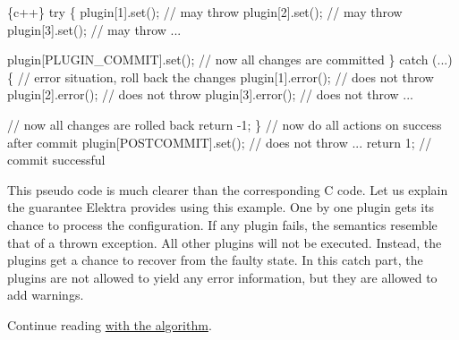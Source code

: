 \begin{DoxyCode}
\{c++\}
try \{
        plugin[1].set(); // may throw
        plugin[2].set(); // may throw
        plugin[3].set(); // may throw
        ...

        plugin[PLUGIN\_COMMIT].set(); // now all changes are committed
\} catch (...) \{
        // error situation, roll back the changes
        plugin[1].error(); // does not throw
        plugin[2].error(); // does not throw
        plugin[3].error(); // does not throw
        ...

        // now all changes are rolled back
        return -1;
\} // now do all actions on success after commit
plugin[POSTCOMMIT].set(); // does not throw
...
return 1; // commit successful
\end{DoxyCode}


This pseudo code is much clearer than the corresponding C code. Let us explain the guarantee Elektra provides using this example. One by one plugin gets its chance to process the configuration. If any plugin fails, the semantics resemble that of a thrown exception. All other plugins will not be executed. Instead, the plugins get a chance to recover from the faulty state. In this catch part, the plugins are not allowed to yield any error information, but they are allowed to add warnings.

Continue reading \hyperlink{doc_dev_algorithm_md}{with the algorithm}. 